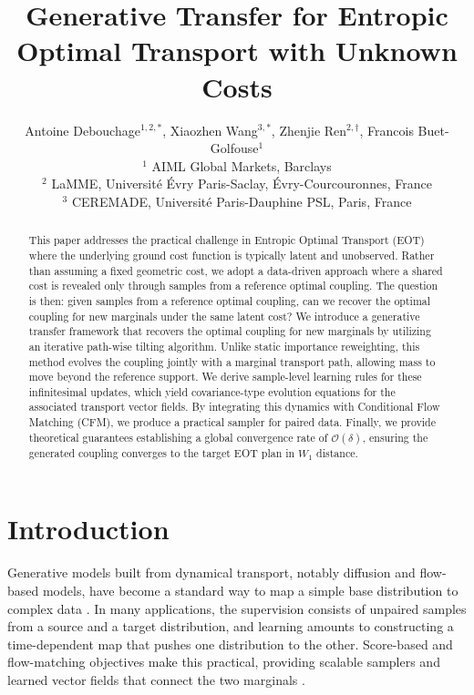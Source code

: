 \documentclass[11pt]{article}
\title{Generative Transfer for Entropic Optimal Transport with Unknown Costs}
\author{
Antoine Debouchage$^{1,2,*}$,
Xiaozhen Wang$^{3,*}$,
Zhenjie Ren$^{2,\dagger}$,
Francois Buet-Golfouse$^{1}$ \\
{\small
$^{1}$ AIML Global Markets, Barclays \\
$^{2}$ LaMME, Université Évry Paris-Saclay, Évry-Courcouronnes, France \\
$^{3}$ CEREMADE, Université Paris-Dauphine PSL, Paris, France
}
}
\date{}
\theoremstyle{definition}
\numberwithin{equation}{section}%
\begin{document}
\maketitle

\begingroup
\renewcommand{\thefootnote}{\fnsymbol{footnote}}
\endgroup


\begin{abstract}
    This paper addresses the practical challenge in Entropic Optimal Transport (EOT) where the underlying ground cost function is typically latent and unobserved.
    Rather than assuming a fixed geometric cost, we adopt a data-driven approach where a shared cost is revealed only through samples from a reference optimal coupling.
    The question is then: given samples from a reference optimal coupling, can we recover the optimal coupling for new marginals under the same latent cost?
    We introduce a generative transfer framework that recovers the optimal coupling for new marginals by utilizing an iterative path-wise tilting algorithm.
    Unlike static importance reweighting, this method evolves the coupling jointly with a marginal transport path, allowing mass to move beyond the reference support.
    We derive sample-level learning rules for these infinitesimal updates, which yield covariance-type evolution equations for the associated transport vector fields.
    By integrating this dynamics with Conditional Flow Matching (CFM), we produce a practical sampler for paired data.
    Finally, we provide theoretical guarantees establishing a global convergence rate of $\mathcal{O}(\delta)$, ensuring the generated coupling converges to the target EOT plan in $W_1$ distance.
\end{abstract}



\section{Introduction}

Generative models built from dynamical transport, notably diffusion and flow-based models, have become a standard way to map a simple base distribution to complex data \citep{ho2020denoising,song2020score,rezende2015variational}.
In many applications, the supervision consists of unpaired samples from a source and a target distribution, and learning amounts to constructing a time-dependent map that pushes one distribution to the other.
Score-based and flow-matching objectives make this practical, providing scalable samplers and learned vector fields that connect the two marginals \citep{lipman2022flow,tong2023improving}.
\end{document}
